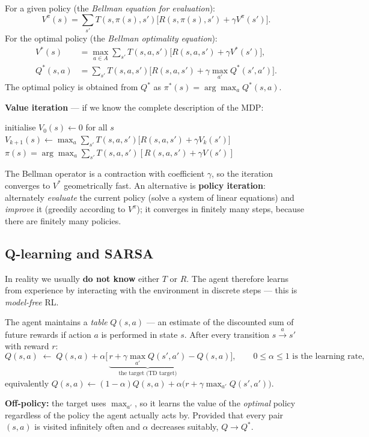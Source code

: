 \documentclass[11pt,a4paper]{article}
\theoremstyle{definition}
\begin{document}
\begin{defbox}
For a given policy (the \emph{Bellman equation for evaluation}):
\[
V^\pi(s) = \sum_{s'} T(s,\pi(s),s') \big[ R(s,\pi(s),s') + \gamma V^\pi(s') \big].
\]
For the optimal policy (the \emph{Bellman optimality equation}):
\begin{align*}
V^*(s) &= \max_{a \in A} \sum_{s'} T(s,a,s') \big[ R(s,a,s') + \gamma V^*(s')\big], \\
Q^*(s,a) &= \sum_{s'} T(s,a,s')\big[R(s,a,s') + \gamma \max_{a'} Q^*(s',a')\big].
\end{align*}
The optimal policy is obtained from $Q^*$ as $\pi^*(s) = \arg\max_a Q^*(s,a)$.
\end{defbox}

\noindent\textbf{Value iteration} --- if we know the complete description of the MDP:
\begin{algorithmic}[1]
\State initialise $V_0(s) \gets 0$ for all $s$
\Repeat
    \State $V_{k+1}(s) \gets \max_{a} \sum_{s'} T(s,a,s')\big[R(s,a,s') + \gamma V_k(s')\big]$
  \EndFor
{}
\State \Return $\pi(s) = \arg\max_a \sum_{s'} T(s,a,s')[R(s,a,s') + \gamma V(s')]$
\end{algorithmic}
The Bellman operator is a contraction with coefficient $\gamma$, so the iteration converges to $V^*$
geometrically fast. An alternative is \textbf{policy iteration}:
alternately \emph{evaluate} the current policy (solve a system of linear equations) and \emph{improve}
it (greedily according to $V^\pi$); it converges in finitely many steps, because there are finitely
many policies.

\subsection{Q-learning and SARSA}

In reality we usually \textbf{do not know} either $T$ or $R$. The agent therefore learns from
experience by interacting with the environment in discrete steps --- this is \emph{model-free} RL.

\begin{defbox}
The agent maintains a \emph{table} $Q(s,a)$ --- an estimate of the discounted sum of future rewards if
action $a$ is performed in state $s$. After every transition $s \xrightarrow{a} s'$ with reward $r$:
\[
Q(s,a) \;\leftarrow\; Q(s,a) + \alpha\Big[\, \underbrace{r + \gamma \max_{a'} Q(s',a')}
_{\text{the target (TD target)}} - Q(s,a) \Big],
\qquad 0 \le \alpha \le 1 \text{ is the learning rate,}
\]
equivalently $Q(s,a) \leftarrow (1-\alpha)Q(s,a) + \alpha\big(r + \gamma\max_{a'}Q(s',a')\big)$.

\textbf{Off-policy:} the target uses $\max_{a'}$, so it learns the value of the \emph{optimal} policy
regardless of the policy the agent actually acts by. Provided that every pair
$(s,a)$ is visited infinitely often and $\alpha$ decreases suitably, $Q \to Q^*$.
\end{defbox}
\end{document}
